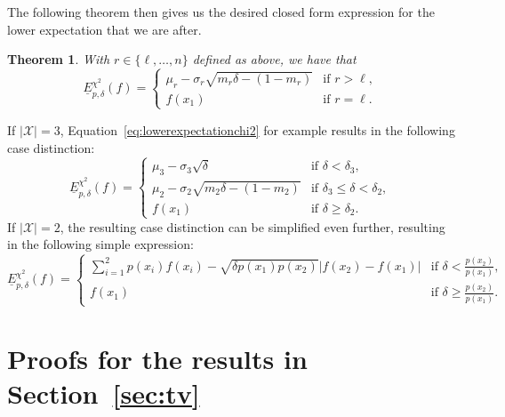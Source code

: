 \documentclass{article}
\newtheorem{theorem}{Theorem}
\begin{document}
The following theorem then gives us the desired closed form expression for the lower expectation that we are after.

\begin{theorem}\label{thm:lowerexpectationchi2}
With $r\in\{\ell,\ldots,n\}$ defined as above, we have that
\begin{equation}\label{eq:lowerexpectationchi2}
    \underline{E}^{\chi^2}_{p,\delta}(f)
    =
    \begin{cases}
    \mu_r-\sigma_r\sqrt{m_r\delta-(1-m_r)} & \text{if } r>\ell,\\
    f(x_1) & \text{if } r=\ell.
    \end{cases}
\end{equation}
\end{theorem}


If $\vert\mathcal{X}\vert=3$, Equation~\eqref{eq:lowerexpectationchi2} for example results in the following case distinction:
\begin{equation}\label{eq:lowerexpectationchi2three}
    \underline{E}^{\chi^2}_{p,\delta}(f)=
    \begin{cases}
        \mu_3-\sigma_3\sqrt{\delta} & \text{if } \delta<\delta_3,\\
        \mu_2-\sigma_2\sqrt{m_2\delta-(1-m_2)} & \text{if } \delta_3\leq\delta<\delta_2,\\
        f(x_1) & \text{if } \delta\geq\delta_2.
    \end{cases}
\end{equation}
If $\vert\mathcal{X}\vert=2$, the resulting case distinction can be simplified even further, resulting in the following simple expression:
\begin{equation}\label{eq:lowerexpectationchi2two}
    \underline{E}^{\chi^2}_{p,\delta}(f)=
    \begin{cases}
        \displaystyle\sum_{i=1}^2p(x_i)f(x_i)-\sqrt{\delta p(x_1)p(x_2)}\vert f(x_2)-f(x_1)\vert & \text{if } \delta<\frac{p(x_2)}{p(x_1)},\\
        f(x_1) & \text{if } \delta\geq\frac{p(x_2)}{p(x_1)}.
    \end{cases}
\end{equation}

\printbibliography

\appendix

\section{Proofs for the results in Section~\ref{sec:tv}}
\end{document}
